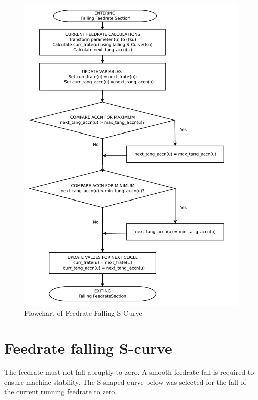 \begin{figure}
	\caption{Flowchart of Feedrate Falling S-Curve}
	\label{03-Feedrate-Falling-Region-flowchart.pdf}
	\centering
	\includegraphics[width=1.10\textwidth,]{Images/Chap3/03-Feedrate-Falling-Region-flowchart.pdf} 
\end{figure}


\clearpage
\pagebreak
\section{Feedrate falling S-curve}

The feedrate must not fall abruptly to zero. A smooth feedrate fall is required to ensure machine stability. The S-shaped curve below was selected for the fall of the current running feedrate to zero. \\

